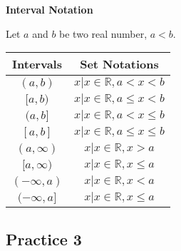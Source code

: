 \documentclass{report}
\begin{document}
\begin{mdframed}[style=MyFrame]
  \large{\textbf{Interval Notation}}
  \normalsize

  \noindent Let $a$ and $b$ be two real number, $a < b$.
  \begin{center}
    \begin{tabular}{|c|c|}
      \hline
      Intervals      & Set Notations                             \\
      \hline
      $(a, b)$       & ${x | x \in \mathbb{R}, a < x < b}$       \\
      $[a, b)$       & ${x | x \in \mathbb{R}, a \leq x < b}$    \\
      $(a, b]$       & ${x | x \in \mathbb{R}, a < x \leq b}$    \\
      $[a, b]$       & ${x | x \in \mathbb{R}, a \leq x \leq b}$ \\
      $(a, \infty)$  & ${x | x \in \mathbb{R}, x > a}$           \\
      $[a, \infty)$  & ${x | x \in \mathbb{R}, x \leq a}$        \\
      $(-\infty, a)$ & ${x | x \in \mathbb{R}, x < a}$           \\
      $(-\infty, a]$ & ${x | x \in \mathbb{R}, x \leq a}$        \\
      \hline
    \end{tabular}
  \end{center}
\end{mdframed}

\subsection{Practice 3}
\end{document}
